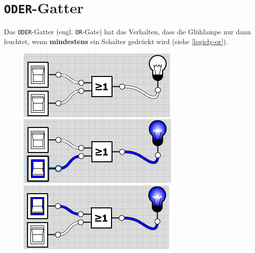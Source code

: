 \section{\texttt{ODER}-Gatter}

Das \texttt{ODER}-Gatter (engl. \texttt{OR}-Gate) hat das Verhalten, dass die Glühlampe nur dann leuchtet, wenn \textbf{mindestens} ein Schalter gedrückt wird (siehe \autoref{logicly-or}).

\begin{figure}[htb]
\centering
\begin{minipage}{0.225\textwidth}
\includegraphics[width=\textwidth]{./or/or_off_off}
\end{minipage}
\begin{minipage}{0.225\textwidth}
\includegraphics[width=\textwidth]{./or/or_off_on}
\end{minipage}
\begin{minipage}{0.225\textwidth}
\includegraphics[width=\textwidth]{./or/or_on_off}

\end{minipage}
\end{figure}
